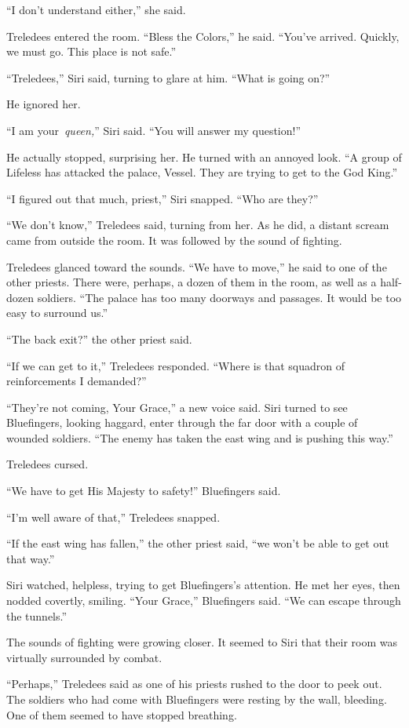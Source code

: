 “I don’t understand either,” she said.

Treledees entered the room. “Bless the Colors,” he said. “You’ve arrived. Quickly, we must go. This place is not safe.”

“Treledees,” Siri said, turning to glare at him. “What is going on?”

He ignored her.

“I am your~\textit{queen,}” Siri said. “You will answer my question!”

He actually stopped, surprising her. He turned with an annoyed look. “A group of Lifeless has attacked the palace, Vessel. They are trying to get to the God King.”

“I figured out that much, priest,” Siri snapped. “Who are they?”

“We don’t know,” Treledees said, turning from her. As he did, a distant scream came from outside the room. It was followed by the sound of fighting.

Treledees glanced toward the sounds. “We have to move,” he said to one of the other priests. There were, perhaps, a dozen of them in the room, as well as a half-dozen soldiers. “The palace has too many doorways and passages. It would be too easy to surround us.”

“The back exit?” the other priest said.

“If we can get to it,” Treledees responded. “Where is that squadron of reinforcements I demanded?”

“They’re not coming, Your Grace,” a new voice said. Siri turned to see Bluefingers, looking haggard, enter through the far door with a couple of wounded soldiers. “The enemy has taken the east wing and is pushing this way.”

Treledees cursed.

“We have to get His Majesty to safety!” Bluefingers said.

“I’m well aware of that,” Treledees snapped.

“If the east wing has fallen,” the other priest said, “we won’t be able to get out that way.”

Siri watched, helpless, trying to get Bluefingers’s attention. He met her eyes, then nodded covertly, smiling. “Your Grace,” Bluefingers said. “We can escape through the tunnels.”

The sounds of fighting were growing closer. It seemed to Siri that their room was virtually surrounded by combat.

“Perhaps,” Treledees said as one of his priests rushed to the door to peek out. The soldiers who had come with Bluefingers were resting by the wall, bleeding. One of them seemed to have stopped breathing.

